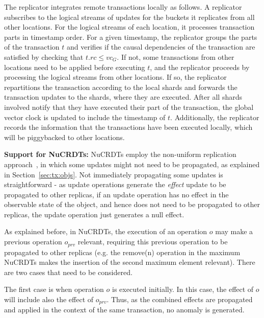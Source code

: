 \documentclass[sigplan,review,anonymous]{acmart}
\newcommand{\code}[1]{\textsf{\small{#1}}}
\begin{document}
The replicator integrates remote transactions locally as follows.
A replicator subscribes to the logical streams of updates for the buckets it replicates from all other 
locations. For the logical streams of each location, it processes transaction parts in timestamp order.
For a given timestamp, the replicator groups the parts of the transaction $t$ and verifies if the causal dependencies 
of the transaction are satisfied by checking that $t.rc \leq \mathit{vc}_G$. If not, some transactions
from other locations need to be applied before executing $t$, and the replicator proceeds by processing
the logical streams from other locations. If so, the replicator repartitions the transaction according to
the local shards and forwards the transaction updates to the shards, where they are executed. 
After all shards involved notify that they have executed their part of the transaction,  the global
vector clock is updated to include the timestamp of $t$.
Additionally, the replicator records the information that the transactions have been executed locally,
which will be piggybacked to other locations.

\textbf{Support for NuCRDTs:}
\label{subsec:nonuniform}
NuCRDTs employ the non-uniform replication approach~\cite{Cabrita17Nonuniform}, in which some 
updates might not need to be propagated, as explained in Section~\ref{sec:tx:objs}.
Not immediately propagating some updates is straightforward - as update operations generate 
the \emph{effect} update to be propagated to other replicas, if an update operation has no
effect in the observable state of the object, and hence does not need to be propagated to other replicas, 
the update operation just generates a null effect.

As explained before, in NuCRDTs, the execution of an operation $o$ may make a previous operation  $o_{prv}$
relevant, requiring this previous operation to be propagated to other replicas  
(e.g. the \code{remove(n)} operation in the maximum NuCRDTs makes the insertion of the second
maximum element relevant). There are two cases that need to be considered.

The first case is when operation $o$ is executed initially. In this case, the effect of
$o$ will include also the effect of $o_{prv}$. Thus, as the combined effects are propagated and applied in 
the context of the same transaction, no anomaly is generated.
\end{document}
